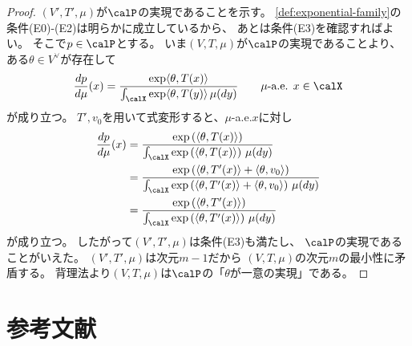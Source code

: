 \documentclass[report]{jlreq}
\begin{document}
\begin{proof}
    $(V', T', \mu)$が$\calP$の実現であることを示す。
    \cref{def:exponential-family}の条件(E0)-(E2)は明らかに成立しているから、
    あとは条件(E3)を確認すればよい。
    そこで$p \in \calP$とする。
    いま$(V, T, \mu)$が$\calP$の実現であることより、
    ある$\theta \in V^\vee$が存在して
    \begin{equation}
        \dd[p]{\mu}(x)
            = \frac{
                \exp\langle \theta, T(x) \rangle
            }{
                \int_{\calX} \exp\langle \theta, T(y) \rangle \, \mu(dy)
            }
            \qquad
            \text{$\mu$-a.e. $x \in \calX$}
    \end{equation}
    が成り立つ。
    $T', v_0$を用いて式変形すると、$\mu$-a.e.$x$に対し
    \begin{alignat}{1}
        \dd[p]{\mu}(x)
            &= \frac{
                \exp\myparen{
                    \langle \theta, T(x) \rangle
                }
            }{
                \int_{\calX} \exp\myparen{
                    \langle \theta, T(x) \rangle
                } \, \mu(dy)
            } \\
            &= \frac{
                \exp\myparen{
                    \langle \theta, T'(x) \rangle
                    + \langle \theta, v_0 \rangle
                }
            }{
                \int_{\calX} \exp\myparen{
                    \langle \theta, T'(x) \rangle
                    + \langle \theta, v_0 \rangle
                } \, \mu(dy)
            } \\
            &= \frac{
                \exp\myparen{
                    \langle \theta, T'(x) \rangle
                }
            }{
                \int_{\calX} \exp\myparen{
                    \langle \theta, T'(x) \rangle
                } \, \mu(dy)
            }
    \end{alignat}
    が成り立つ。
    したがって$(V', T', \mu)$は条件(E3)も満たし、
    $\calP$の実現であることがいえた。
    $(V', T', \mu)$は次元$m - 1$だから
    $(V, T, \mu)$の次元$m$の最小性に矛盾する。
    背理法より$(V, T, \mu)$は$\calP$の「$\theta$が一意の実現」である。
\end{proof}

%
\section{参考文献}

{
    \renewcommand{\bibsection}{}
    
    
}
\end{document}
